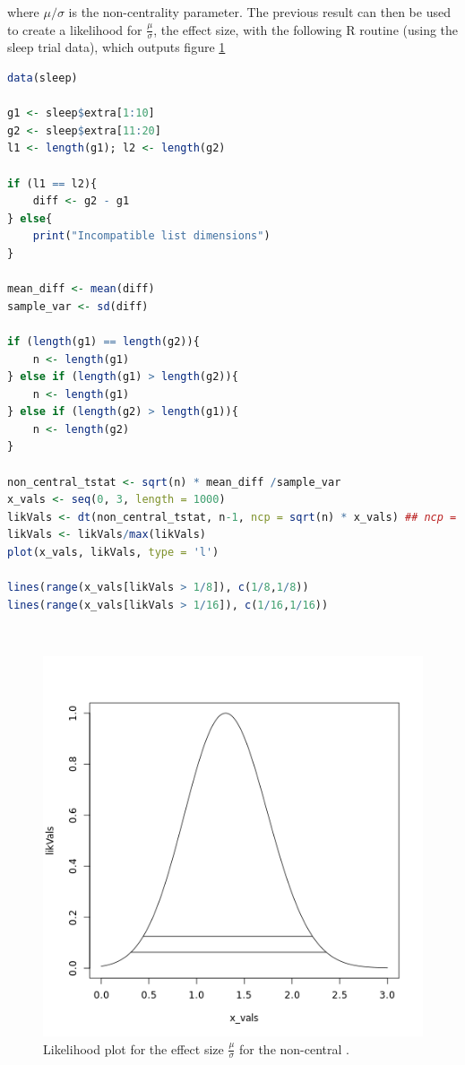 \documentclass{homework}
\begin{document}
where $\mu/\sigma$ is the non-centrality parameter. The previous result can then be used to create a likelihood for $\frac{\mu}{\sigma}$, the effect size, with the following R routine (using the sleep trial data), which outputs figure \ref{fig:likplot_nctdis}

\begin{lstlisting}[language=R]
data(sleep)

g1 <- sleep$extra[1:10]
g2 <- sleep$extra[11:20]
l1 <- length(g1); l2 <- length(g2)

if (l1 == l2){
    diff <- g2 - g1
} else{
    print("Incompatible list dimensions")
} 

mean_diff <- mean(diff)
sample_var <- sd(diff) 

if (length(g1) == length(g2)){
    n <- length(g1)
} else if (length(g1) > length(g2)){
    n <- length(g1)    
} else if (length(g2) > length(g1)){
    n <- length(g2)
}

non_central_tstat <- sqrt(n) * mean_diff /sample_var
x_vals <- seq(0, 3, length = 1000)
likVals <- dt(non_central_tstat, n-1, ncp = sqrt(n) * x_vals) ## ncp = non-centrality parameter
likVals <- likVals/max(likVals)
plot(x_vals, likVals, type = 'l')

lines(range(x_vals[likVals > 1/8]), c(1/8,1/8))
lines(range(x_vals[likVals > 1/16]), c(1/16,1/16))
\end{lstlisting} 

\textnormal{ } \\

\begin{figure}
    \centering
    \includegraphics[scale=.5]{figs/non-central-tdis-mu-div-sigma-likelihood.png}
    \caption{Likelihood plot for the effect size $\frac{\mu}{\sigma}$ for the non-central \tdis. }
    \label{fig:likplot_nctdis}
\end{figure}
\end{document}
